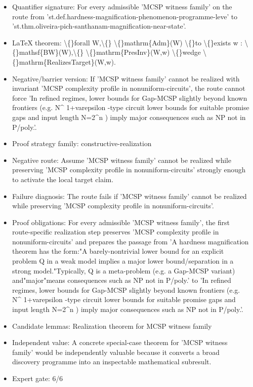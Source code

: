 \documentclass[11pt]{article}
\begin{document}
\begin{itemize}
\item Quantifier signature: For every admissible 'MCSP witness family' on the route from 'st.def.hardness-magnification-phenomenon-programme-leve' to 'st.thm.oliveira-pich-santhanam-magnification-near-state'.
\item LaTeX theorem: \textbackslash\{\}forall W,\textbackslash\{\} \textbackslash\{\}mathrm\{Adm\}(W) \textbackslash\{\}to \textbackslash\{\}exists w : \textbackslash\{\}mathsf\{BW\}(W),\textbackslash\{\} \textbackslash\{\}mathrm\{PresInv\}(W,w) \textbackslash\{\}wedge \textbackslash\{\}mathrm\{RealizesTarget\}(W,w).
\item Negative/barrier version: If 'MCSP witness family' cannot be realized with invariant 'MCSP complexity profile in nonuniform-circuits', the route cannot force 'In refined regimes, lower bounds for Gap-MCSP slightly beyond known frontiers (e.g. N\textasciicircum{} 1+varepsilon -type circuit lower bounds for suitable promise gaps and input length N=2\textasciicircum{}n ) imply major consequences such as NP not in P/poly.'.
\item Proof strategy family: constructive-realization
\item Negative route: Assume 'MCSP witness family' cannot be realized while preserving 'MCSP complexity profile in nonuniform-circuits' strongly enough to activate the local target claim.
\item Failure diagnosis: The route fails if 'MCSP witness family' cannot be realized while preserving 'MCSP complexity profile in nonuniform-circuits'.
\item Proof obligations: For every admissible 'MCSP witness family', the first route-specific realization step preserves 'MCSP complexity profile in nonuniform-circuits' and prepares the passage from 'A hardness magnification theorem has the form:"A barely-nontrivial lower bound for an explicit problem Q in a weak model implies a major lower bound/separation in a strong model."Typically, Q is a meta-problem (e.g. a Gap-MCSP variant) and"major"means consequences such as NP not in P/poly.' to 'In refined regimes, lower bounds for Gap-MCSP slightly beyond known frontiers (e.g. N\textasciicircum{} 1+varepsilon -type circuit lower bounds for suitable promise gaps and input length N=2\textasciicircum{}n ) imply major consequences such as NP not in P/poly.'.
\item Candidate lemmas: Realization theorem for MCSP witness family
\item Independent value: A concrete special-case theorem for 'MCSP witness family' would be independently valuable because it converts a broad discovery programme into an inspectable mathematical subresult.
\item Expert gate: 6/6
\end{itemize}
\end{document}
